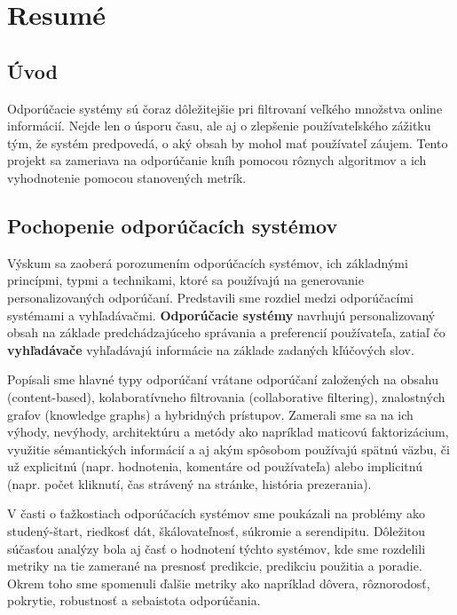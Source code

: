 \documentclass[\myFontSize,a4paper,oneside,hidelinks]{article}
\begin{document}
%

\clearpage{}
\section*{Resumé}

\subsection*{Úvod}
Odporúčacie systémy sú čoraz dôležitejšie pri filtrovaní veľkého množstva online informácií. Nejde len o úsporu času, ale aj o zlepšenie používateľského zážitku tým, že systém predpovedá, o aký obsah by mohol mať používateľ záujem. Tento projekt sa zameriava na odporúčanie kníh pomocou rôznych algoritmov a ich vyhodnotenie pomocou stanovených metrík.

\subsection*{Pochopenie odporúčacích systémov}

Výskum sa zaoberá porozumením odporúčacích systémov, ich základnými princípmi, typmi a technikami, ktoré sa používajú na generovanie personalizovaných odporúčaní. Predstavili sme rozdiel medzi odporúčacími systémami a vyhľadávačmi. \textbf{Odporúčacie systémy} navrhujú personalizovaný obsah na základe predchádzajúceho správania a preferencií používateľa, zatiaľ čo \textbf{vyhľadávače} vyhľadávajú informácie na základe zadaných kľúčových slov.

Popísali sme hlavné typy odporúčaní vrátane odporúčaní založených na obsahu (content-based), kolaboratívneho filtrovania (collaborative filtering), znalostných grafov (knowledge graphs) a hybridných prístupov. Zamerali sme sa na ich výhody, nevýhody, architektúru a metódy ako napríklad maticovú faktorizácium, využitie sémantických informácií a aj akým spôsobom používajú spätnú väzbu, či už explicitnú (napr. hodnotenia, komentáre od používateľa) alebo implicitnú (napr. počet kliknutí, čas strávený na stránke, história prezerania).

V časti o ťažkostiach odporúčacích systémov sme poukázali na problémy ako studený-štart, riedkosť dát, škálovateľnosť, súkromie a serendipitu. 
Dôležitou súčasťou analýzy bola aj časť o hodnotení týchto systémov, kde sme rozdelili metriky na tie zamerané na presnosť predikcie, predikciu použitia a poradie. Okrem toho sme spomenuli ďalšie metriky ako napríklad dôvera, rôznorodosť, pokrytie, robustnosť a sebaistota odporúčania.
\end{document}
